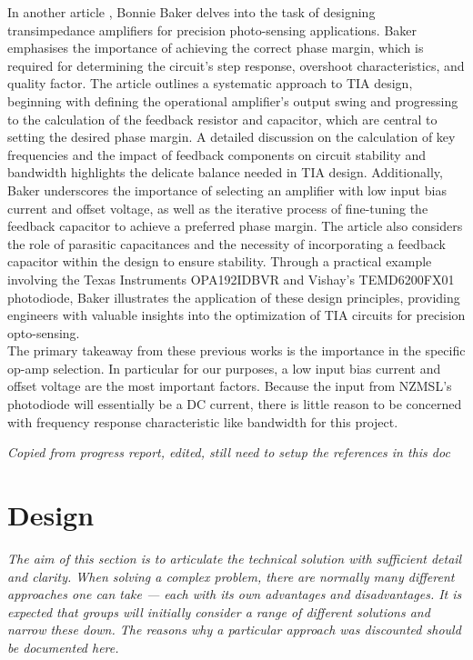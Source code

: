 \documentclass[conference]{IEEEtran}
\begin{document}
In another article \cite{baker_2017}, Bonnie Baker delves into the task of designing transimpedance amplifiers for precision photo-sensing applications. Baker emphasises the importance of achieving the correct phase margin, which is required for determining the circuit’s step response, overshoot characteristics, and quality factor. The article outlines a systematic approach to TIA design, beginning with defining the operational amplifier's output swing and progressing to the calculation of the feedback resistor and capacitor, which are central to setting the desired phase margin. A detailed discussion on the calculation of key frequencies and the impact of feedback components on circuit stability and bandwidth highlights the delicate balance needed in TIA design. Additionally, Baker underscores the importance of selecting an amplifier with low input bias current and offset voltage, as well as the iterative process of fine-tuning the feedback capacitor to achieve a preferred phase margin. The article also considers the role of parasitic capacitances and the necessity of incorporating a feedback capacitor within the design to ensure stability. Through a practical example involving the Texas Instruments OPA192IDBVR and Vishay's TEMD6200FX01 photodiode, Baker illustrates the application of these design principles, providing engineers with valuable insights into the optimization of TIA circuits for precision opto-sensing.\\

The primary takeaway from these previous works is the importance in the specific op-amp selection. In particular for our purposes, a low input bias current and offset voltage are the most important factors. Because the input from NZMSL's photodiode will essentially be a DC current, there is little reason to be concerned with frequency response characteristic like bandwidth for this project. 

\textit{Copied from progress report, edited, still need to setup the references in this doc}

\section{Design}

\textit{The aim of this section is to articulate the technical solution with sufficient detail and clarity. When solving a complex problem, there are normally many different approaches one can take — each with its own advantages and disadvantages. It is expected that groups will initially consider a range of different solutions and narrow these down. The reasons why a particular approach was discounted should be documented here.} \\
\end{document}
